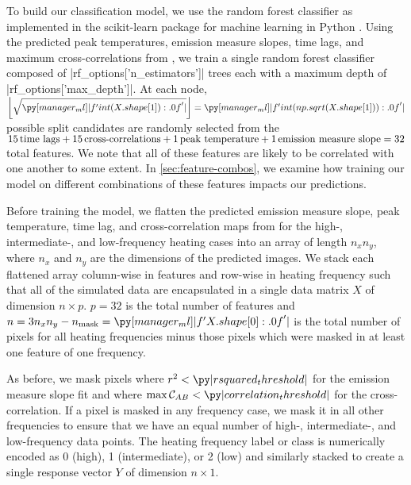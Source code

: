 To build our classification model, we use the random forest classifier as implemented in the scikit-learn package for machine learning in Python \citep{pedregosa_scikit-learn_2011}.
Using the predicted peak temperatures, emission measure slopes, time lags, and maximum cross-correlations from , we train a single random forest classifier composed of \py[manager_ml]|rf_options['n_estimators']| trees each with a maximum depth of \py[manager_ml]|rf_options['max_depth']|.
At each node, $\left\lfloor\sqrt{\py[manager_ml]|f'{int(X.shape[1]):.0f}'|}\right\rfloor=\py[manager_ml]|f'{int(np.sqrt(X.shape[1])):.0f}'|$ possible split candidates are randomly selected from the $15\,\textup{time lags} + 15\,\textup{cross-correlations} + 1\,\textup{peak temperature} + 1\,\textup{emission measure slope}=32$ total features.
We note that all of these features are likely to be correlated with one another to some extent.
In \autoref{sec:feature-combos}, we examine how training our model on different combinations of these features impacts our predictions.

Before training the model, we flatten the predicted emission measure slope, peak temperature, time lag, and cross-correlation maps from  for the high-, intermediate-, and low-frequency heating cases into an array of length $n_xn_y$, where $n_x$ and $n_y$ are the dimensions of the predicted images.
We stack each flattened array column-wise in features and row-wise in heating frequency such that all of the simulated data are encapsulated in a single data matrix $X$ of dimension $n\times p$.
$p=32$ is the total number of features and $n=3n_xn_y - n_\textup{mask}=\py[manager_ml]|f'{X.shape[0]:.0f}'|$ is the total number of pixels for all heating frequencies minus those pixels which were masked in at least one feature of one frequency.

As before, we mask pixels where $r^2<\py|rsquared_threshold|$ for the emission measure slope fit and where $\max\mathcal{C}_{AB}<\py|correlation_threshold|$ for the cross-correlation.
If a pixel is masked in any frequency case, we mask it in all other frequencies to ensure that we have an equal number of high-, intermediate-, and low-frequency data points.
The heating frequency label or class is numerically encoded as 0 (high), 1 (intermediate), or 2 (low) and similarly stacked to create a single response vector $Y$ of dimension $n\times1$.

